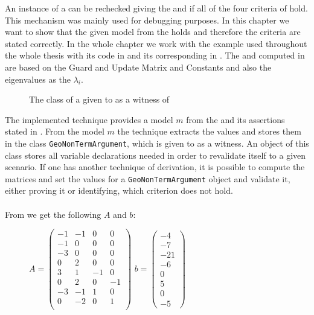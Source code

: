 An instance of a \gna can be rechecked giving the \iterationmatrix and \iterationconstants if all of the four criteria of  hold. This mechanism was mainly used for debugging purposes. In this chapter we want to show that the given model from the \solver holds and therefore the criteria are stated correctly. \newline
In the whole chapter we work with the example used throughout the whole thesis with its  code in  and its corresponding \its in . The \iterationmatrix and \iterationconstants computed in  are based on the Guard and Update Matrix and Constants and also the eigenvalues as the $\lambda_i$.\newline
\begin{figure}[H]
	\centering
	
	\caption{The  class of a \gna given to \aprove as a witness of \nonterm}	
	\label{dia:gna-classdiagram}
\end{figure}
The implemented technique provides a model $m$ from the \solver and its assertions stated in . From the model $m$ the technique extracts the values and stores them in the class \texttt{GeoNonTermArgument}, which is given to \aprove as a witness. An object of this class stores all variable declarations needed in order to revalidate itself to a given scenario. If one has another technique of derivation, it is possible to compute the matrices and set the values for a  \texttt{GeoNonTermArgument} object and validate it, either proving it or identifying, which criterion does not hold.\\ \\
From  we get the following \iterationmatrix $A$ and \iterationconstants $b$: 
\begin{figure}[H]
	\centering
	$A=\begin{pmatrix}
		-1 		& -1 		&  0		& 0		 \\
		-1 		& 0 		&  0		& 0		 \\
		-3 		& 0 		&  0		& 0		 \\
		0 		& 2 		&  0		& 0		 \\
		3 		& 1 		&  -1		& 0		 \\
		0 		& 2 		&  0		& -1	 \\
		-3 		& -1 		&  1		& 0		 \\
		0 		& -2 		&  0		& 1	 	 \\
	\end{pmatrix}$	
	$b=\begin{pmatrix}
		-4 \\ -7 \\ -21 \\ -6 \\ 0 \\ 5 \\ 0 \\ -5
	\end{pmatrix}$
\end{figure}
